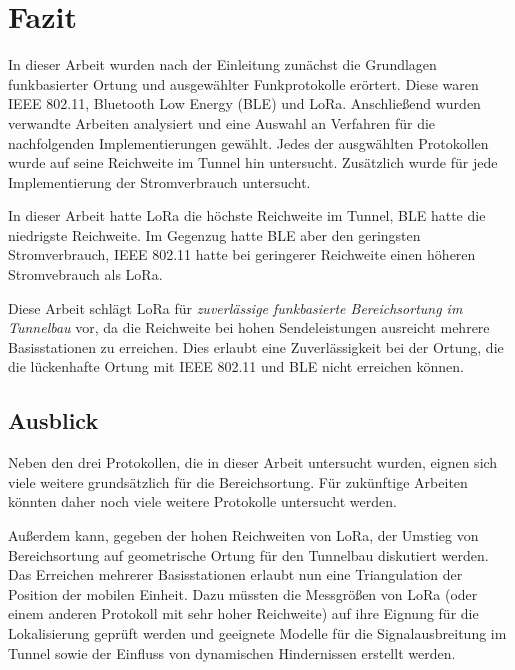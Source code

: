 \chapter{Fazit}
\label{ch:Fazit}
In dieser Arbeit wurden nach der Einleitung zunächst die Grundlagen funkbasierter Ortung und ausgewählter Funkprotokolle erörtert.
Diese waren IEEE 802.11, Bluetooth Low Energy (BLE) und LoRa.
Anschließend wurden verwandte Arbeiten analysiert und eine Auswahl an Verfahren für die nachfolgenden Implementierungen gewählt.
Jedes der ausgwählten Protokollen wurde auf seine Reichweite im Tunnel hin untersucht.
Zusätzlich wurde für jede Implementierung der Stromverbrauch untersucht.

In dieser Arbeit hatte LoRa die höchste Reichweite im Tunnel, BLE hatte die niedrigste Reichweite.
Im Gegenzug hatte BLE aber den geringsten Stromverbrauch, IEEE 802.11 hatte bei geringerer Reichweite einen höheren Stromvebrauch als LoRa.

Diese Arbeit schlägt LoRa für \emph{zuverlässige funkbasierte Bereichsortung im Tunnelbau} vor, da die Reichweite bei hohen Sendeleistungen ausreicht mehrere Basisstationen zu erreichen. 
Dies erlaubt eine Zuverlässigkeit bei der Ortung, die die lückenhafte Ortung mit IEEE 802.11 und BLE nicht erreichen können.

\section{Ausblick}
Neben den drei Protokollen, die in dieser Arbeit untersucht wurden, eignen sich viele weitere grundsätzlich für die Bereichsortung.
Für zukünftige Arbeiten könnten daher noch viele weitere Protokolle untersucht werden. 

Außerdem kann, gegeben der hohen Reichweiten von LoRa, der Umstieg von Bereichsortung auf geometrische Ortung für den Tunnelbau diskutiert werden. 
Das Erreichen mehrerer Basisstationen erlaubt nun eine Triangulation der Position der mobilen Einheit.
Dazu müssten die Messgrößen von LoRa (oder einem anderen Protokoll mit sehr hoher Reichweite) auf ihre Eignung für die Lokalisierung geprüft werden und geeignete Modelle für die Signalausbreitung im Tunnel sowie der Einfluss von dynamischen Hindernissen erstellt werden.


